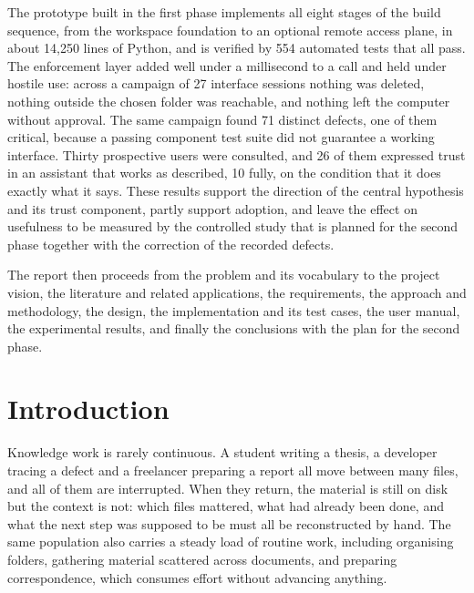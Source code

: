 \documentclass{FastFyp}
\begin{document}
The prototype built in the first phase implements all eight stages of the build sequence, from the workspace foundation to an optional remote access plane, in about 14,250 lines of Python, and is verified by 554 automated tests that all pass. The enforcement layer added well under a millisecond to a call and held under hostile use: across a campaign of 27 interface sessions nothing was deleted, nothing outside the chosen folder was reachable, and nothing left the computer without approval. The same campaign found 71 distinct defects, one of them critical, because a passing component test suite did not guarantee a working interface. Thirty prospective users were consulted, and 26 of them expressed trust in an assistant that works as described, 10 fully, on the condition that it does exactly what it says. These results support the direction of the central hypothesis and its trust component, partly support adoption, and leave the effect on usefulness to be measured by the controlled study that is planned for the second phase together with the correction of the recorded defects.

The report then proceeds from the problem and its vocabulary to the project vision, the literature and related applications, the requirements, the approach and methodology, the design, the implementation and its test cases, the user manual, the experimental results, and finally the conclusions with the plan for the second phase.
\pagebreak

\pagestyle{fancy}
\tableofcontents

\pagebreak
\listoffigures
{}
\pagebreak
\listoftables
{}

\mainmatter


\chapter{Introduction}
Knowledge work is rarely continuous. A student writing a thesis, a developer tracing a defect and a freelancer preparing a report all move between many files, and all of them are interrupted. When they return, the material is still on disk but the context is not: which files mattered, what had already been done, and what the next step was supposed to be must all be reconstructed by hand. The same population also carries a steady load of routine work, including organising folders, gathering material scattered across documents, and preparing correspondence, which consumes effort without advancing anything.
\end{document}
